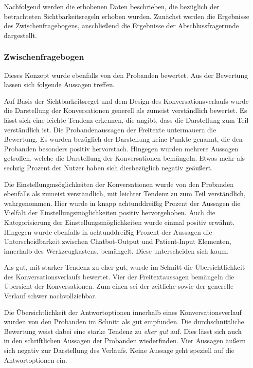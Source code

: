Nachfolgend werden die erhobenen Daten beschrieben, die bezüglich der betrachteten Sichtbarkeitsregeln erhoben wurden. Zunächst werden die Ergebnisse des Zwischenfragebogens, anschließend die Ergebnisse der Abschlussfragerunde dargestellt.

\subsubsection{Zwischenfragebogen}
Dieses Konzept wurde ebenfalls von den Probanden bewertet. Aus der Bewertung lassen sich folgende Aussagen treffen. 

Auf Basis der Sichtbarkeitsregel und dem Design des Konversationsverlaufs wurde die Darstellung der Konversationen generell als zumeist verständlich bewertet. Es lässt sich eine leichte Tendenz erkennen, die angibt, dass die Darstellung zum Teil verständlich ist. Die Probandenaussagen der Freitexte untermauern die Bewertung. Es wurden bezüglich der Darstellung keine Punkte genannt, die den Probanden besonders positiv hervorstach. Hingegen wurden mehrere Aussagen getroffen, welche die Darstellung der Konversationen bemängeln. Etwas mehr als sechzig Prozent der Nutzer haben sich diesbezüglich negativ geäußert.

Die Einstellungmsöglichkeiten der Konversationen wurde von den Probanden ebenfalls als zumeist verständlich, mit leichter Tendenz zu zum Teil verständlich, wahrgenommen. Hier wurde in knapp achtunddreißig Prozent der Aussagen die Vielfalt der Einstellungsmöglichkeiten positiv hervorgehoben. Auch die Kategorisierung der Einstellungsmöglichkeiten wurde einmal positiv erwähnt. Hingegen wurde ebenfalls in achtunddreißig Prozent der Aussagen die Unterscheidbarkeit zwischen Chatbot-Output und Patient-Input Elementen, innerhalb des Werkzeugkastens, bemängelt. Diese unterscheiden sich kaum. 

Als gut, mit starker Tendenz zu eher gut, wurde im Schnitt die Übersichtlichkeit des Konversationsverlaufs bewertet. Vier der Freitextaussagen bemängeln die Übersicht der Konversationen. Zum einen sei der zeitliche sowie der generelle Verlauf schwer nachvollziehbar.

Die Übersichtlichkeit der Antwortoptionen innerhalb eines Konversationsverlauf wurden von den Probanden im Schnitt als gut empfunden. Die durchschnittliche Bewertung weist dabei eine starke Tendenz zu \emph{eher gut} auf. Dies lässt sich auch in den schriftlichen Aussagen der Probanden wiederfinden. Vier Aussagen äußern sich negativ zur Darstellung des Verlaufs. Keine Aussage geht speziell auf die Antwortoptionen ein. 

